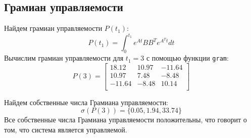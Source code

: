 \subsection{Грамиан управляемости}
Найдем грамиан управляемости $P(t_1)$:
\begin{equation}
    P(t_1) = \int_{0}^{t_1} e^{At}BB^Te^{A^Tt}dt
\end{equation}
Вычислим грамиан управляемости для $t_1 = 3$ с помощью функции \texttt{gram}: 
\begin{equation}
    P(3) = \begin{bmatrix}
        18.12 & 10.97 & -11.64 \\ 
        10.97 & 7.48 & -8.48 \\ 
        -11.64 & -8.48 & 10.14 \\ 
    \end{bmatrix}
\end{equation}

Найдем собственные числа Грамиана управляемости: 
\begin{equation}
    \sigma(P(3)) = \{ 0.05, 1.94, 33.74 \}
\end{equation}
Все собственные числа Грамиана управляемости положительны, что говорит о том, что система является управляемой.



